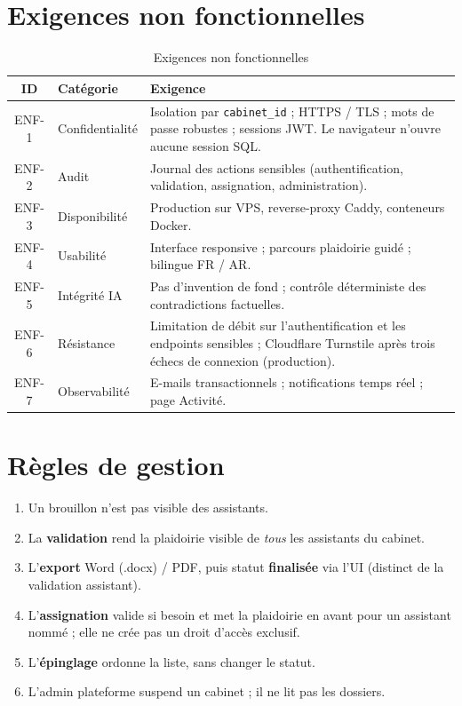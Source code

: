 \section{Exigences non fonctionnelles}

\begin{table}[H]
\centering
\caption{Exigences non fonctionnelles}
\label{tab:enf}
\small
\renewcommand{\arraystretch}{1.2}
\begin{tabular}{@{}clp{9.8cm}@{}}
\toprule
\textbf{ID} & \textbf{Catégorie} & \textbf{Exigence} \\
\midrule
ENF-1 & Confidentialité & Isolation par \texttt{cabinet\_id} ; HTTPS / TLS ; mots de passe robustes ; sessions JWT. Le navigateur n'ouvre aucune session SQL. \\
ENF-2 & Audit & Journal des actions sensibles (authentification, validation, assignation, administration). \\
ENF-3 & Disponibilité & Production sur VPS, reverse-proxy Caddy, conteneurs Docker. \\
ENF-4 & Usabilité & Interface responsive ; parcours plaidoirie guidé ; bilingue FR / AR. \\
ENF-5 & Intégrité IA & Pas d'invention de fond ; contrôle déterministe des contradictions factuelles. \\
ENF-6 & Résistance & Limitation de débit sur l'authentification et les endpoints sensibles ; Cloudflare Turnstile après trois échecs de connexion (production). \\
ENF-7 & Observabilité & E-mails transactionnels ; notifications temps réel ; page Activité. \\
\bottomrule
\end{tabular}
\end{table}

\section{Règles de gestion}

\begin{enumerate}[leftmargin=1.4em]
  \item Un brouillon n'est pas visible des assistants.
  \item La \textbf{validation} rend la plaidoirie visible de \emph{tous} les assistants du cabinet.
  \item L'\textbf{export} Word (.docx) / PDF, puis statut \textbf{finalisée} via l'UI (distinct de la validation assistant).
  \item L'\textbf{assignation} valide si besoin et met la plaidoirie en avant pour un assistant nommé ; elle ne crée pas un droit d'accès exclusif.
  \item L'\textbf{épinglage} ordonne la liste, sans changer le statut.
  \item L'admin plateforme suspend un cabinet ; il ne lit pas les dossiers.
\end{enumerate}


